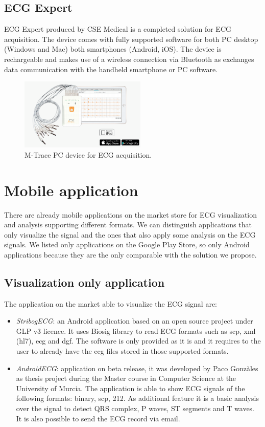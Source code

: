 \subsection{ECG Expert}
ECG Expert produced by CSE Medical is a completed solution for ECG acquisition. The device comes with fully supported software for both PC desktop (Windows and Mac) both smartphones  (Android, iOS). The device is rechargeable and makes use of a wireless connection via Bluetooth as exchanges data communication with the handheld smartphone or PC software.
\begin{figure}[ht!]
	\centering
	\includegraphics[width=60mm]{figures/ch3/5.png}
	\caption{M-Trace PC device for ECG acquisition.}
	\label{fig3.5}
\end{figure}

\section{Mobile application}
There are already mobile applications on the market store for ECG visualization and analysis supporting different formats. We can distinguish applications that only visualize the signal and the ones that also apply some analysis on the ECG signals. We listed only applications on the Google Play Store, so only Android applications because they are the only comparable with the solution we propose.

\subsection{Visualization only application}
The application on the market able to visualize the ECG signal are:
\begin{itemize}
	\item \textit{StribogECG}: an Android application based on an open source project under GLP v3 licence. It uses Biosig library to read ECG formats such as scp, xml (hl7), ecg and dgf. The software is only provided as it is and it requires to the user to already have the ecg files stored in those supported formats.
	\item \textit{AndroidECG}: application on beta release, it was developed by Paco Gonzàles as thesis project during the Master course in Computer Science at the University of Murcia. The application is able to show ECG signals of the following formats: binary, scp, 212. As additional feature it is a basic analysis over the signal to detect QRS complex, P waves, ST segments and T waves. It is also possible to send the ECG record via email.
\end{itemize}

